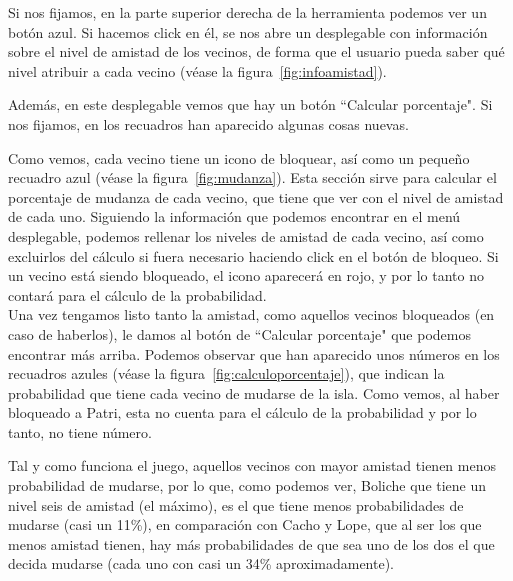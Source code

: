 Si nos fijamos, en la parte superior derecha de la herramienta podemos ver un botón azul. Si hacemos click en él, se nos abre un desplegable con información sobre el nivel de amistad de los vecinos, de forma que el usuario pueda saber qué nivel atribuir a cada vecino {(v\'ease la figura~\ref{fig:infoamistad})}.\\


\clearpage

Además, en este desplegable vemos que hay un botón ``Calcular porcentaje". Si nos fijamos, en los recuadros han aparecido algunas cosas nuevas.\\


Como vemos, cada vecino tiene un icono de bloquear, así como un pequeño recuadro azul {(v\'ease la figura~\ref{fig:mudanza})}. Esta sección sirve para calcular el porcentaje de mudanza de cada vecino, que tiene que ver con el nivel de amistad de cada uno. Siguiendo la información que podemos encontrar en el menú desplegable, podemos rellenar los niveles de amistad de cada vecino, así como excluirlos del cálculo si fuera necesario haciendo click en el botón de bloqueo. Si un vecino está siendo bloqueado, el icono aparecerá en rojo, y por lo tanto no contará para el cálculo de la probabilidad.\\

Una vez tengamos listo tanto la amistad, como aquellos vecinos bloqueados (en caso de haberlos), le damos al botón de ``Calcular porcentaje" que podemos encontrar más arriba. Podemos observar que han aparecido unos números en los recuadros azules {(v\'ease la figura~\ref{fig:calculoporcentaje})}, que indican la probabilidad que tiene cada vecino de mudarse de la isla. Como vemos, al haber bloqueado a Patri, esta no cuenta para el cálculo de la probabilidad y por lo tanto, no tiene número.\\


Tal y como funciona el juego, aquellos vecinos con mayor amistad tienen menos probabilidad de mudarse, por lo que, como podemos ver, Boliche que tiene un nivel seis de amistad (el máximo), es el que tiene menos probabilidades de mudarse (casi un 11\%), en comparación con Cacho y Lope, que al ser los que menos amistad tienen, hay más probabilidades de que sea uno de los dos el que decida mudarse (cada uno con casi un 34\% aproximadamente).\\

